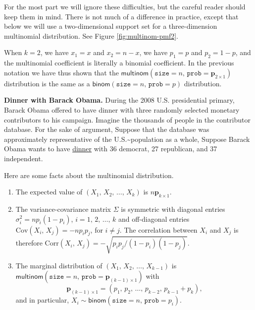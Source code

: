 \documentclass[captions=tableheading]{scrbook}
\begin{document}
For the most part we will ignore these difficulties, but the careful reader should keep them in mind. There is not much of a difference in practice, except that below we will use a two-dimensional support set for a three-dimension multinomial distribution. See Figure \ref{fig:multinom-pmf2}.

When \(k=2\), we have \(x_{1}=x\) and \(x_{2}=n-x\), we have \(p_{1}=p\) and \(p_{2}=1-p\), and the multinomial coefficient is literally a binomial coefficient. In the previous notation we have thus shown that the \(\mathsf{multinom}(\mathtt{size}=n,\,\mathtt{prob}=\mathbf{p}_{2\times1})\) distribution is the same as a \(\mathsf{binom}(\mathtt{size}=n,\,\mathtt{prob}=p)\) distribution.

\begin{example}
\textbf{Dinner with Barack Obama.} During the 2008 U.S. presidential primary, Barack Obama offered to have dinner with three randomly selected monetary contributors to his campaign. Imagine the thousands of people in the contributor database. For the sake of argument, Suppose that the database was approximately representative of the U.S.\~{}population as a whole, Suppose Barack Obama wants to have \href{http://pewresearch.org/pubs/773/fewer-voters-identify-as-republicans}{dinner} with 36 democrat, 27 republican, and 37 independent.
\end{example}

\begin{rem}
Here are some facts about the multinomial distribution.
\begin{enumerate}
\item The expected value of \((X_{1},\, X_{2},\,\ldots,\, X_{k})\) is \(n\mathbf{p}_{k\times1}\).
\item The variance-covariance matrix \(\Sigma\) is symmetric with diagonal entries \(\sigma_{i}^{2}=np_{i}(1-p_{i})\), \(i=1,\,2,\,\ldots,\, k\) and off-diagonal entries \(\mbox{Cov}(X_{i},\, X_{j})=-np_{i}p_{j}\), for \(i\neq j\). The correlation between \(X_{i}\) and \(X_{j}\) is therefore \(\mbox{Corr}(X_{i},\, X_{j})=-\sqrt{p_{i}p_{j}/(1-p_{i})(1-p_{j})}\).
\item The marginal distribution of \((X_{1},\, X_{2},\,\ldots,\, X_{k-1})\) is \(\mathsf{multinom}(\mathtt{size}=n,\,\mathtt{prob}=\mathbf{p}_{(k-1)\times1})\) with
   \begin{equation}
   \mathbf{p}_{(k-1)\times1}=\left(p_{1},\, p_{2},\,\ldots,\, p_{k-2},\, p_{k-1}+p_{k}\right),
   \end{equation}
   and in particular, \(X_{i}\sim\mathsf{binom}(\mathtt{size}=n,\,\mathtt{prob}=p_{i})\).
\end{enumerate}

\end{rem}
\end{document}
